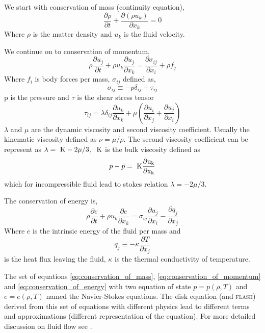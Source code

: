 \documentclass[a4paper,12pt,modern]{aastex62}
\def \K{~\rm{K}}
\begin{document}
We start with conservation of mass (continuity equation),
\begin{equation}\label{eq:conservation_of_mass}
\frac{\partial \rho}{\partial t} + \frac{\partial (\rho u_k)}{\partial x_k} = 0
\end{equation}
Where $\rho$ is the matter density and $u_k$ is the fluid velocity.

We continue on to conservation of momentum,
\begin{equation}\label{eq:conservation_of_momentum}
\rho\frac{\partial u_j}{\partial t} + \rho u_k \frac{\partial u_j}{\partial x_k}=\frac{\partial \sigma_{ij}}{\partial x_i}+\rho f_j
\end{equation}
Where $f_i$ is body forces per mass, $\sigma_{ij}$ defined as, 
\begin{equation}
\sigma_{ij} \equiv -p\delta_{ij}+\tau_{ij}
\end{equation}
p is the pressure and $\tau$ is the shear stress tensor
\begin{equation}
     \tau_{ij} = \lambda \delta_{ij} \frac{\partial u_k}{\partial x_k}+ \mu \left( \frac{\partial u_i}{\partial x_j} + \frac{\partial u_j}{\partial x_i} \right)
\end{equation}
$\lambda$ and $\mu$ are the dynamic viscosity and second viscosity coefficient. Usually the kinematic viscosity defined as $\nu = \mu/\rho$. The second viscosity coefficient can be represent as $\lambda = \K - 2\mu/3$, $\K$ is the bulk viscosity defined as
\begin{equation}
    p-\bar p = \K \frac{\partial u_k}{\partial x_k} 
\end{equation}
which for incompressible fluid lead to stokes relation $\lambda = - 2\mu/3$.

The conservation of energy is,
\begin{equation} \label{eq:conservation_of_energy}
\rho\frac{\partial e}{\partial t}+\rho u_k \frac{\partial e}{\partial x_k} = \sigma_{ij} \frac{\partial u_j}{\partial x_i} - \frac{\partial q_j}{\partial x_j}
\end{equation}
Where $e$ is the intrinsic energy of the fluid per mass and 
\begin{equation}
q_j \equiv -\kappa \frac {\partial T}{\partial x_j}    
\end{equation}
is the heat flux leaving the fluid, $\kappa$ is the thermal conductivity of temperature.

The set of equations \ref{eq:conservation_of_mass}, \ref{eq:conservation_of_momentum} and \ref{eq:conservation_of_energy} with two equation of state $p=p(\rho,T)$ and $e=e(\rho,T)$ named the Navier-Stokes equations. 
The disk equation (and \textsc{flash}) derived from this set of equations with different physics lead to different terms and approximations (different representation of the equation).
For more detailed discussion on fluid flow see \cite{currie2002fundamental}.
\end{document}
